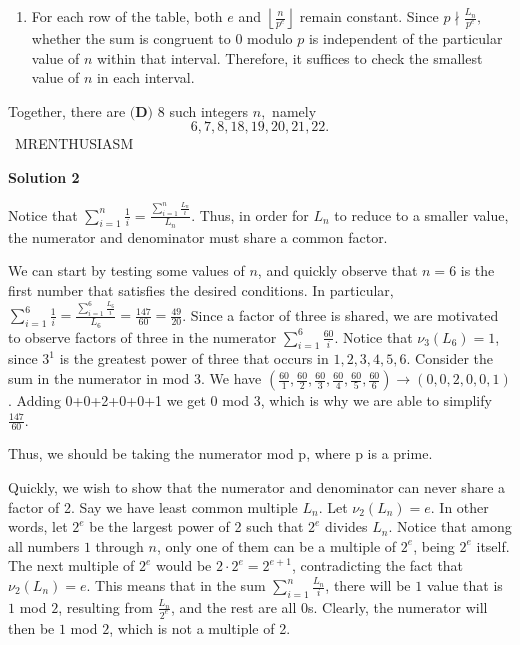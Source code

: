 \begin{enumerate}
\begin{enumerate}
        \item For each row of the table, both $e$ and $\left\lfloor \frac{n}{p^e} \right\rfloor$ remain constant. Since $p\nmid \frac{L_n}{p^e},$ whether the sum is congruent to $0$ modulo $p$ is independent of the particular value of $n$ within that interval. Therefore, it suffices to check the smallest value of $n$ in each interval.

            \end{enumerate}
            Together, there are $\boxed{\textbf{(D) }8}$ such integers $n,$ namely 
 \[6,7,8,18,19,20,21,22.\]~MRENTHUSIASM

 



\textbf{Solution 2}

Notice that $\sum_{i=1}^{n}\frac{1}{i} = \frac{\sum_{i=1}^{n}\frac{L_n}{i}}{L_n}$. Thus, in order for $L_n$ to reduce to a smaller value, the numerator and denominator must share a common factor. 

 We can start by testing some values of $n$, and quickly observe that $n=6$ is the first number that satisfies the desired conditions. In particular, $\sum_{i=1}^{6}\frac{1}{i} = \frac{\sum_{i=1}^{6}\frac{L_6}{i}}{L_6} = \frac{147}{60} = \frac{49}{20}$. Since a factor of three is shared, we are motivated to observe factors of three in the numerator $\sum_{i=1}^{6}\frac{60}{i}$. Notice that $\nu_3(L_6) = 1$, since $3^1$ is the greatest power of three that occurs in $1,2,3,4,5,6$. Consider the sum in the numerator in mod 3. We have $(\frac{60}{1}, \frac{60}{2}, \frac{60}{3}, \frac{60}{4}, \frac{60}{5}, \frac{60}{6} )\rightarrow (0,0,2,0,0,1)$. Adding 0+0+2+0+0+1 we get 0 mod 3, which is why we are able to simplify $\frac{147}{60}$.

 Thus, we should be taking the numerator mod p, where p is a prime. 

 Quickly, we wish to show that the numerator and denominator can never share a factor of 2. Say we have least common multiple $L_n$. Let $\nu_2(L_n) = e$. In other words, let $2^e$ be the largest power of 2 such that $2^e$ divides $L_n$. Notice that among all numbers $1$ through $n$, only one of them can be a multiple of $2^e$, being $2^e$ itself. The next multiple of $2^e$ would be $2 \cdot 2^e = 2^{e+1}$, contradicting the fact that $\nu_2(L_n) = e$. This means that in the sum $\sum_{i=1}^{n}\frac{L_n}{i}$, there will be $1$ value that is $1$ mod $2$, resulting from $\frac{L_n}{2^e}$, and the rest are all $0$s. Clearly, the numerator will then be $1$ mod $2$, which is not a multiple of 2.


\end{enumerate}
